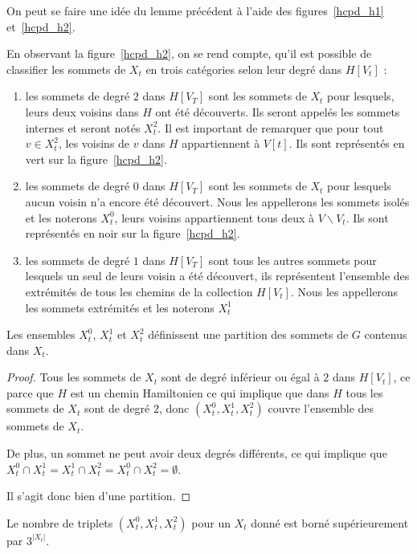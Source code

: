 On peut se faire une idée du lemme précédent à l'aide des figures~\ref{hcpd_h1}
et~\ref{hcpd_h2}.

En observant la figure~\ref{hcpd_h2}, on se rend compte, qu'il est possible de classifier les
sommets de $X_t$ en trois catégories selon leur degré dans $H[V_t]$ :
\begin{enumerate}
    \item les sommets de degré $2$ dans $H[V_T]$ sont les sommets de $X_t$ pour lesquels, leurs
        deux voisins dans $H$ ont été découverts. Ils seront appelés les sommets internes et seront
        notés $X_t^2$. Il est important de remarquer que pour tout $v \in X_t^2$, les voisins de $v$
        dans $H$ appartiennent à $V[t]$. Ils sont représentés en vert sur la figure~\ref{hcpd_h2}.
    \item les sommets de degré $0$ dans $H[V_T]$ sont les sommets de $X_t$ pour lesquels aucun
        voisin n'a encore été découvert. Nous les appellerons les sommets isolés et les noterons
        $X_t^0$, leurs voisins appartiennent tous deux à $V\backslash V_t$. Ils sont représentés en noir sur
        la figure~\ref{hcpd_h2}.
    \item les sommets de degré $1$ dans $H[V_T]$ sont tous les autres sommets pour lesquels un seul
        de leurs voisin a été découvert, ils représentent l'ensemble des extrémités de tous les
        chemins de la collection $H[V_t]$. Nous les appellerons les sommets extrémités et les
        noterons $X_t^1$
\end{enumerate}

\begin{nlemma}
    Les ensembles $X_t^0$, $X_t^1$ et $X_t^2$ définissent une partition des sommets de $G$ contenus
    dans $X_t$.
\end{nlemma}

\begin{proof}
    Tous les sommets de $X_t$ sont de degré inférieur ou égal à $2$ dans $H[V_t]$, ce parce que $H$
    est un chemin Hamiltonien ce qui implique que dans $H$ tous les sommets de $X_t$ sont de degré
    $2$, donc $(X_t^0, X_t^1, X_t^2)$ couvre l'ensemble des sommets de $X_t$.

    De plus, un sommet ne peut avoir deux degrés différents, ce qui implique que $X_t^0 \cap X_t^1 =
    X_t^1 \cap X_t^2 = X_t^0 \cap X_t^2 = \emptyset$.

    Il s'agit donc bien d'une partition.
\end{proof}

\begin{ncorol}
    \label{hcpd_ntrip}
    Le nombre de triplets $(X_t^0, X_t^1, X_t^2)$ pour un $X_t$ donné est borné supérieurement par
    $3^{|X_t|}$.
\end{ncorol}

